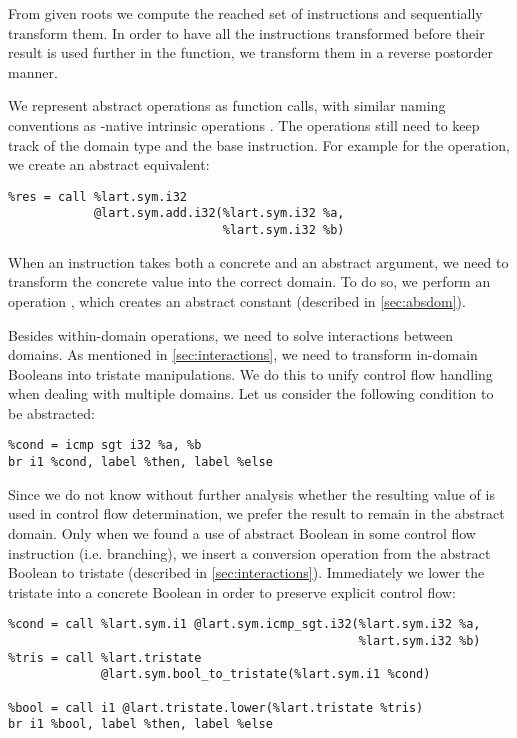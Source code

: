 From given roots we compute the reached set of instructions and sequentially
transform them. In order to have all the instructions transformed before their
result is used further in the function, we transform them in a reverse postorder manner.

We represent abstract operations as function calls, with similar naming
conventions as \LLVM-native intrinsic operations \cite{LLVM:langref}. The
operations still need to keep track of the domain type and the base \LLVM instruction.
For example for the  operation, we create an abstract equivalent:
\begin{verbatim}
%res = call %lart.sym.i32
            @lart.sym.add.i32(%lart.sym.i32 %a,
                              %lart.sym.i32 %b)
\end{verbatim}

When an instruction takes both a concrete and an abstract argument, we need to
transform the concrete value into the correct domain. To do so, we perform an
operation , which creates an abstract constant (described in
\autoref{sec:absdom}).

Besides within-domain operations, we need to solve interactions between domains.
As mentioned in \autoref{sec:interactions}, we need to transform in-domain
Booleans into tristate manipulations. We do this to unify control flow
handling when dealing with multiple domains. Let us consider the following
condition to be abstracted:
\begin{verbatim}
%cond = icmp sgt i32 %a, %b
br i1 %cond, label %then, label %else
\end{verbatim}
Since we do not know without further analysis whether the resulting value of
 is used in control flow determination, we prefer the result to
remain in the abstract domain. Only when we found a use of abstract Boolean in
some control flow instruction (i.e. branching), we insert a conversion operation
from the abstract Boolean to tristate (described in \autoref{sec:interactions}).
Immediately we lower the tristate into a concrete Boolean in order to preserve
explicit control flow:
\begin{verbatim}
%cond = call %lart.sym.i1 @lart.sym.icmp_sgt.i32(%lart.sym.i32 %a,
                                                 %lart.sym.i32 %b)
%tris = call %lart.tristate
             @lart.sym.bool_to_tristate(%lart.sym.i1 %cond)

%bool = call i1 @lart.tristate.lower(%lart.tristate %tris)
br i1 %bool, label %then, label %else
\end{verbatim}

